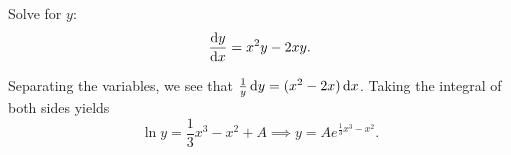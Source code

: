 %
\begin{example}
    Solve for $y$:
    $$\frac{\dif y}{\dif x} = x^2y-2xy.$$
\end{example}
\begin{soln}
    Separating the variables, we see that $\frac{1}{y} \dif y = (x^2-2x) \dif x$.
    Taking the integral of both sides yields
    $$\ln y = \frac{1}{3}x^3-x^2 + A \implies y = Ae^{\frac{1}{3}x^3-x^2}.$$
\end{soln}
